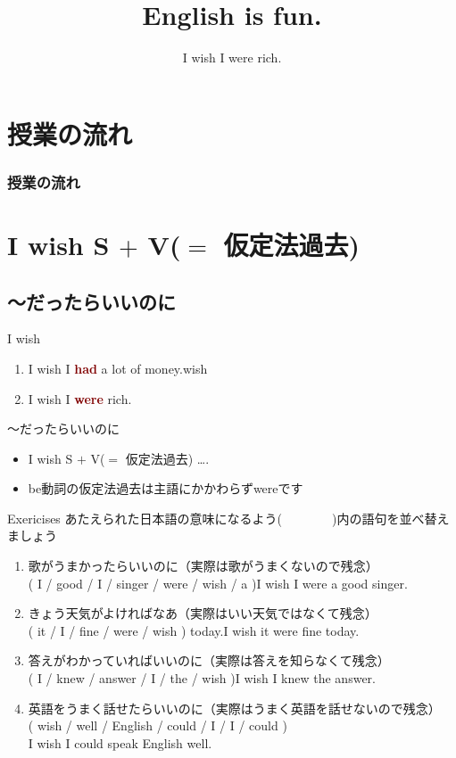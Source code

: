 \documentclass[aspectratio=169,xcolor={dvipsnames,table}]{beamer}
\title{English is fun.}
\subtitle{I wish I were rich.}
\author{}
\institute[]{}
\date[]
\begin{document}
\begin{frame}[plain]
  \titlepage
\end{frame}

\section*{授業の流れ}
\begin{frame}[plain]
  \frametitle{授業の流れ}
  \tableofcontents
\end{frame}

\section{I wish S $+$ V($=$ 仮定法過去)}
\subsection{～だったらいいのに}
\begin{frame}[plain]{I wish}
\large
 \begin{enumerate}
  \item I wish I \textcolor{Maroon}{\bfseries had} a lot of money.\hfill{}wish 
  \item I wish I \textcolor{Maroon}{\bfseries were} rich.
\end{enumerate}

\vfill

\begin{block}{～だったらいいのに}
\small
\begin{itemize}[square]
 \item I wish S $+$ V($=$ {\scriptsize 仮定法過去}) \ldots .
 \item be動詞の仮定法過去は主語にかかわらずwereです
\end{itemize}
\end{block}
\end{frame}
\begin{frame}[plain]{Exericises}
 あたえられた日本語の意味になるよう(~~~~~~~~)内の語句を並べ替えましょう

\begin{enumerate}
 \item 歌がうまかったらいいのに（実際は歌がうまくないので残念）\\
( I / good / I / singer / were / wish / a )\hfill{}I wish I were a good singer.
 \item きょう天気がよければなあ（実際はいい天気ではなくて残念）\\
( it / I / fine / were / wish ) today.\hfill{}I wish it were fine today.
 \item 答えがわかっていればいいのに（実際は答えを知らなくて残念）\\
( I / knew / answer / I / the / wish )\hfill{}I wish I knew the answer.
 \item 英語をうまく話せたらいいのに（実際はうまく英語を話せないので残念）\\
( wish / well / English / could / I / I / could )\\
\hfill{}I wish I could speak English well.
\end{enumerate}
\end{frame}
\end{document}
